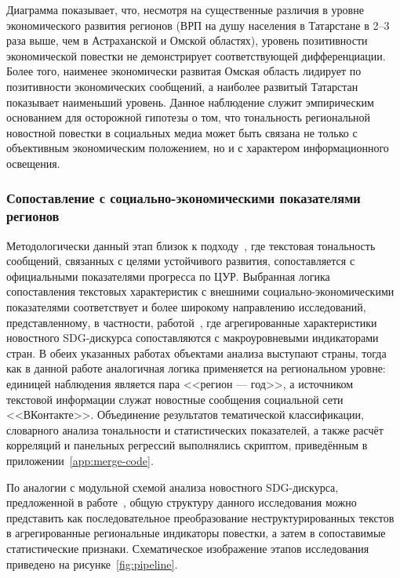 \documentclass[master, och, coursework]{SCWorks1}
\begin{document}
Диаграмма показывает, что, несмотря на существенные различия в уровне экономического развития регионов (ВРП на душу населения в Татарстане в 2--3 раза выше, чем в Астраханской и Омской областях), уровень позитивности экономической повестки не демонстрирует соответствующей дифференциации. Более того, наименее экономически развитая Омская область лидирует по позитивности экономических сообщений, а наиболее развитый Татарстан показывает наименьший уровень. Данное наблюдение служит эмпирическим основанием для осторожной гипотезы о том, что тональность региональной новостной повестки в социальных медиа может быть связана не только с объективным экономическим положением, но и с характером информационного освещения.

\subsubsection{Сопоставление с социально-экономическими показателями регионов}

Методологически данный этап близок к подходу~\cite{Funk2024}, где текстовая тональность сообщений, связанных с целями устойчивого развития, сопоставляется с официальными показателями прогресса по ЦУР. Выбранная логика сопоставления текстовых характеристик с внешними социально-экономическими показателями соответствует и более широкому направлению исследований, представленному, в частности, работой~\cite{Sufi2025}, где агрегированные характеристики новостного SDG-дискурса сопоставляются с макроуровневыми индикаторами стран. В обеих указанных работах объектами анализа выступают страны, тогда как в данной работе аналогичная логика применяется на региональном уровне: единицей наблюдения является пара <<регион --- год>>, а источником текстовой информации служат новостные сообщения социальной сети <<ВКонтакте>>. Объединение результатов тематической классификации, словарного анализа тональности и статистических показателей, а также расчёт корреляций и панельных регрессий выполнялись скриптом, приведённым в приложении~\ref{app:merge-code}.

По аналогии с модульной схемой анализа новостного SDG-дискурса, предложенной в работе~\cite{Sufi2025}, общую структуру данного исследования можно представить как последовательное преобразование неструктурированных текстов в агрегированные региональные индикаторы повестки, а затем в сопоставимые статистические признаки. Схематическое изображение этапов исследования приведено на рисунке~\ref{fig:pipeline}.
\end{document}
